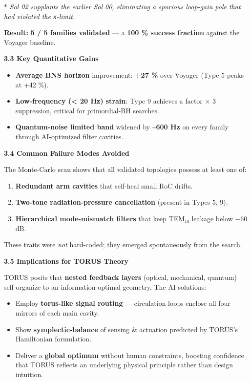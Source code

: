 \documentclass[]{article}
\begin{document}
* \emph{Sol 02 supplants the earlier Sol 00, eliminating a spurious
loop-gain pole that had violated the κ-limit.}

\textbf{Result:} \textbf{5 / 5 families validated} --- a \textbf{100 \%
success fraction} against the Voyager baseline.

\textbf{3.3 Key Quantitative Gains}

\begin{itemize}
\item
  \textbf{Average BNS horizon} improvement: \textbf{+27 \%} over Voyager
  (Type 5 peaks at +42 \%).
\item
  \textbf{Low-frequency (\textless{} 20 Hz) strain}: Type 9 achieves a
  factor × 3 suppression, critical for primordial-BH searches.
\item
  \textbf{Quantum-noise limited band} widened by
  \textbf{\textasciitilde{}600 Hz} on every family through AI-optimized
  filter cavities.
\end{itemize}

\textbf{3.4 Common Failure Modes Avoided}

The Monte-Carlo scan shows that all validated topologies possess at
least one of:

\begin{enumerate}
\def\labelenumi{\arabic{enumi}.}
\item
  \textbf{Redundant arm cavities} that self-heal small RoC drifts.
\item
  \textbf{Two-tone radiation-pressure cancellation} (present in Types 5,
  9).
\item
  \textbf{Hierarchical mode-mismatch filters} that keep TEM₁₀ leakage
  below −60 dB.
\end{enumerate}

These traits were \emph{not} hard-coded; they emerged spontaneously from
the search.

\textbf{3.5 Implications for TORUS Theory}

TORUS posits that \textbf{nested feedback layers} (optical, mechanical,
quantum) self-organize to an information-optimal geometry. The AI
solutions:

\begin{itemize}
\item
  Employ \textbf{torus-like signal routing} --- circulation loops
  enclose all four mirrors of each main cavity.
\item
  Show \textbf{symplectic-balance} of sensing \& actuation predicted by
  TORUS's Hamiltonian formulation.
\item
  Deliver a \textbf{global optimum} without human constraints, boosting
  confidence that TORUS reflects an underlying physical principle rather
  than design intuition.
\end{itemize}
\end{document}

